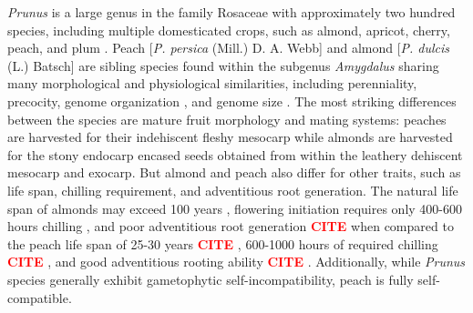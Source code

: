 \documentclass[12pt]{article}
\newcommand{\citex}{\textcolor{red}{\bf CITE }}
\begin{document}
\emph{Prunus} is a large genus in the family Rosaceae with approximately two hundred species, including multiple domesticated crops, such as almond, apricot, cherry, peach, and plum \citep{rehder1940manual, potter2011prunus}.
%
Peach [\emph{P. persica} (Mill.) D. A. Webb] and almond [\emph{P. dulcis} (L.) Batsch] are sibling species found within the subgenus \emph{Amygdalus} sharing many morphological and physiological similarities, including perenniality, precocity, genome organization \citep{arus2012peach}, and genome size \citep{baird1994estimating}. 
%
The most striking differences between the species are mature fruit morphology and mating systems: peaches are harvested for their indehiscent fleshy mesocarp while almonds are harvested for the stony endocarp encased seeds obtained from within the leathery dehiscent mesocarp and exocarp. 
%
But almond and peach also differ for other traits, such as life span, chilling requirement, and adventitious root generation.
%
The natural life span of almonds may exceed 100 years \citep{gradziel2011origin},
flowering initiation requires only 400-600 hours chilling \citep{alonso2005determination}, 
and poor adventitious root generation \citex when compared to the peach life span of 25-30 years \citex, 
600-1000 hours of required chilling \citex,
% 
%
and good adventitious rooting ability \citex. 
%
Additionally, while \emph{Prunus} species generally exhibit gametophytic self-incompatibility, peach is fully self-compatible.
\end{document}
